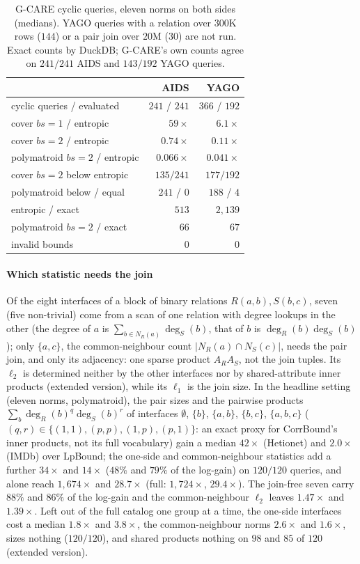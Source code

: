 \documentclass[sigconf, nonacm, acmthm=false]{acmart}
\begin{document}
\begin{table}[t]
\centering
\caption{G-CARE cyclic queries, eleven norms on both sides (medians). YAGO
queries with a relation over $300$K rows ($144$) or a pair join over
$20$M ($30$) are not run. Exact counts by DuckDB; G-CARE's own counts
agree on $241/241$ AIDS and $143/192$ YAGO queries.}
\label{tab:gcare}
\small\setlength{\tabcolsep}{4pt}
\begin{tabular}{@{}lrr@{}}
\toprule
 & AIDS & YAGO \\
\midrule
cyclic queries / evaluated & $241$ / $241$ & $366$ / $192$ \\
cover $bs{=}1$ / entropic & $59\times$ & $6.1\times$ \\
cover $bs{=}2$ / entropic & $0.74\times$ & $0.11\times$ \\
polymatroid $bs{=}2$ / entropic & $0.066\times$ & $0.041\times$ \\
cover $bs{=}2$ below entropic & $135/241$ & $177/192$ \\
polymatroid below / equal & $241$ / $0$ & $188$ / $4$ \\
entropic / exact & $513$ & $2{,}139$ \\
polymatroid $bs{=}2$ / exact & $66$ & $67$ \\
invalid bounds & $0$ & $0$ \\
\bottomrule
\end{tabular}
\end{table}

\paragraph{Which statistic needs the join}
Of the eight interfaces of a block of binary relations $R(a,b),S(b,c)$,
seven (five non-trivial) come from a scan of one relation with degree lookups in the other
(the degree of $a$ is $\sum_{b\in N_R(a)}\deg_S(b)$, that of $b$ is
$\deg_R(b)\deg_S(b)$); only $\{a,c\}$, the common-neighbour count
$|N_R(a)\cap N_S(c)|$, needs the pair join, and only its adjacency: one
sparse product $A_RA_S$, not the join tuples. Its $\ell_2$ is determined
neither by the other interfaces nor by shared-attribute inner products
(extended version), while its $\ell_1$ is the join size. In the headline
setting (eleven norms, polymatroid), the pair sizes and the pairwise
products $\sum_b \deg_R(b)^q\deg_S(b)^r$ of interfaces $\emptyset$, $\{b\}$,
$\{a,b\}$, $\{b,c\}$, $\{a,b,c\}$ ($(q,r)\in\{(1,1),(p,p),(1,p),(p,1)\}$: an exact proxy for CorrBound's inner products, not its full vocabulary)
gain a median $42\times$ (Hetionet) and $2.0\times$ (IMDb) over LpBound; the
one-side and common-neighbour statistics add a further $34\times$ and
$14\times$ ($48\%$ and $79\%$ of the log-gain) on $120/120$ queries, and alone reach $1{,}674\times$ and
$28.7\times$ (full: $1{,}724\times$, $29.4\times$). The join-free seven
carry $88\%$ and $86\%$ of the log-gain and the common-neighbour $\ell_2$
leaves $1.47\times$ and $1.39\times$. Left out of the full catalog one
group at a time, the one-side interfaces cost a median $1.8\times$ and
$3.8\times$, the common-neighbour norms $2.6\times$ and $1.6\times$,
sizes nothing ($120/120$), and shared products nothing on $98$ and $85$ of
$120$ (extended version).
\end{document}
